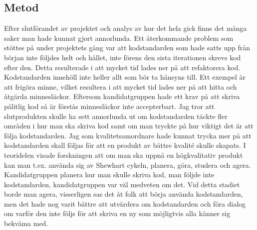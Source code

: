 \subsection{Metod}
Efter slutförandet av projektet och analys av hur det hela gick finns det många saker man hade kunnat gjort annorlunda. Ett återkommande problem som stöttes på under projektets gång var att kodstandarden som hade satts upp från början inte följdes helt och hållet, inte förens den sista iterationen skrevs kod efter den. Detta resulterade i att mycket tid lades ner på att refaktorera kod. Kodstandarden innehöll inte heller allt som bör ta hänsyns till. Ett exempel är att frigöra minne, vilket resultera i att mycket tid lades ner på att hitta och åtgärda minnesläckor. Eftersom kandidatgruppen hade ett krav på att skriva pålitlig kod så är förstås minnesläckor inte accepterbart. 
\newline
\newline
Jag tror att slutprodukten skulle ha sett annorlunda ut om kodstandarden täckte fler områden i hur man ska skriva kod samt om man tryckte på hur viktigt det är att följa kodstandarden. Jag som kvalitetsamordnare hade kunnat trycka mer på att kodstandarden skall följas för att en produkt av bättre kvalité skulle skapats.
\newline
\newline
I teoridelen visade forskningen att om man ska uppnå en högkvalitativ produkt kan man t.ex. använda sig av Shewhart cykeln, planera, göra, studera och agera. Kandidatgruppen planera hur man skulle skriva kod, man följde inte kodstandarden, kandidatgruppen var väl medveten om det. Vid detta stadiet borde man agera, visserligen sas det åt folk att börja använda kodstandarden, men det hade nog varit bättre att utvärdera om kodstandarden och föra dialog om varför den inte följs för att skriva en ny som möjligtvis alla känner sig bekväma med.
